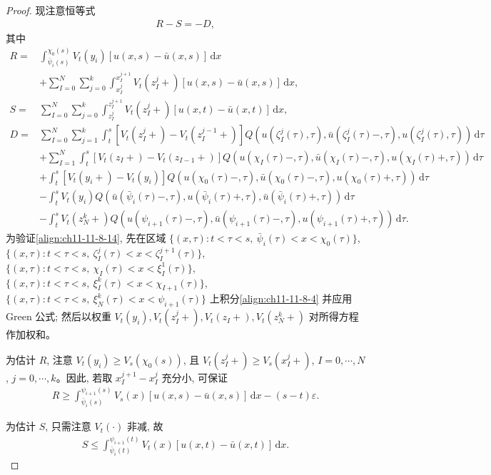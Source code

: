 \documentclass[../../main.tex]{subfiles}
\begin{document}
\begin{proof}
现注意恒等式
\begin{align}
R-S=-D,\label{align:ch11-11-8-14}
\end{align}
其中
\begin{align}
R=&\int_{\bar\psi_i(s)}^{\chi_0(s)}V_t(y_i)[u(x,s)-\bar u(x,s)]\,\mathrm{d}x\nonumber\\
&+\sum_{I=0}^N\sum_{j=0}^k\int_{x_I^j}^{x_I^{j+1}}V_t(z_I^j+)[u(x,s)-\bar u(x,s)]\,\mathrm{d}x,\label{align:ch11-11-8-15}\\
S=&\sum_{I=0}^N\sum_{j=0}^k\int_{z_I^j}^{z_I^{j+1}}V_t(z_I^j+)[u(x,t)-\bar u(x,t)]\,\mathrm{d}x,\label{align:ch11-11-8-16}\\
D=&\sum_{I=0}^N\sum_{j=1}^k\int_t^s[V_t(z_I^j+)-V_t(z_I^{j-1}+)]Q(u(\zeta_I^j(\tau),\tau),\bar u(\zeta_I^j(\tau)-,\tau),u(\zeta_I^j(\tau),\tau))\,\mathrm{d}\tau\nonumber\\
&+\sum_{I=1}^N\int_t^s[V_t(z_I+)-V_t(z_{I-1}+)]Q(u(\chi_I(\tau)-,\tau),\bar u(\chi_I(\tau)-,\tau),u(\chi_I(\tau)+,\tau))\,\mathrm{d}\tau\nonumber\\
&+\int_t^s[V_t(y_i+)-V_t(y_i)]Q(u(\chi_0(\tau)-,\tau),\bar u(\chi_0(\tau)-,\tau),u(\chi_0(\tau)+,\tau))\,\mathrm{d}\tau\nonumber\\
&-\int_t^s V_t(y_i)Q(\bar u(\bar\psi_i(\tau)-,\tau),u(\bar\psi_i(\tau)+,\tau),\bar u(\bar\psi_i(\tau)+,\tau))\,\mathrm{d}\tau\nonumber\\
&-\int_t^s V_t(z_N^k+)Q(u(\psi_{i+1}(\tau)-,\tau),\bar u(\psi_{i+1}(\tau)-,\tau),u(\psi_{i+1}(\tau)+,\tau))\,\mathrm{d}\tau.\label{align:ch11-11-8-17}
\end{align}
为验证\eqref{align:ch11-11-8-14}, 先在区域 $\{(x,\tau):t<\tau<s,\ \bar\psi_i(\tau)<x<\chi_0(\tau)\}$, $\{(x,\tau):t<\tau<s,\ \zeta_I^j(\tau)<x<\zeta_I^{j+1}(\tau)\}$, $\{(x,\tau):t<\tau<s,\ \chi_I(\tau)<x<\xi_I^1(\tau)\}$, $\{(x,\tau):t<\tau<s,\ \xi_I^k(\tau)<x<\chi_{I+1}(\tau)\}$, $\{(x,\tau):t<\tau<s,\ \xi_N^k(\tau)<x<\psi_{i+1}(\tau)\}$ 上积分\eqref{align:ch11-11-8-4} 并应用 Green 公式; 然后以权重 $V_t(y_i),V_t(z_I^j+),V_t(z_I+),V_t(z_N^k+)$ 对所得方程作加权和。

为估计 $R$, 注意 $V_t(y_i)\geqslant V_s(\chi_0(s))$, 且 $V_t(z_I^j+)\geqslant V_s(x_I^j+)$, $I=0,\cdots,N$, $j=0,\cdots,k$。因此, 若取 $x_I^{j+1}-x_I^j$ 充分小, 可保证
\begin{align}
R\geqslant\int_{\bar\psi_i(s)}^{\psi_{i+1}(s)}V_s(x)[u(x,s)-\bar u(x,s)]\,\mathrm{d}x-(s-t)\varepsilon.\label{align:ch11-11-8-18}
\end{align}

为估计 $S$, 只需注意 $V_t(\cdot)$ 非减, 故
\begin{align}
S\leqslant\int_{\bar\psi_i(t)}^{\psi_{i+1}(t)}V_t(x)[u(x,t)-\bar u(x,t)]\,\mathrm{d}x.\label{align:ch11-11-8-19}
\end{align}


\end{proof}
\end{document}
